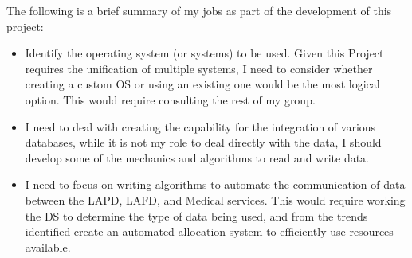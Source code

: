 \documentclass[a4paper, 11pt]{report}
\begin{document}
The following is a brief summary of my jobs as part of the development of this project:
\begin{itemize}
    \item Identify the operating system (or systems) to be used. Given this Project requires the unification of multiple systems, I need to consider whether creating a custom OS or using an existing one would be the most logical option. This would require consulting the rest of my group. 
    \item I need to deal with creating the capability for the integration of various databases, while it is not my role to deal directly with the data, I should develop some of the mechanics and algorithms to read and write data. 
    \item I need to focus on writing algorithms to automate the communication of data between the LAPD, LAFD, and Medical services. This would require working the DS to determine the type of data being used, and from the trends identified create an automated allocation system to efficiently use resources available. 
\end{itemize}
\end{document}
